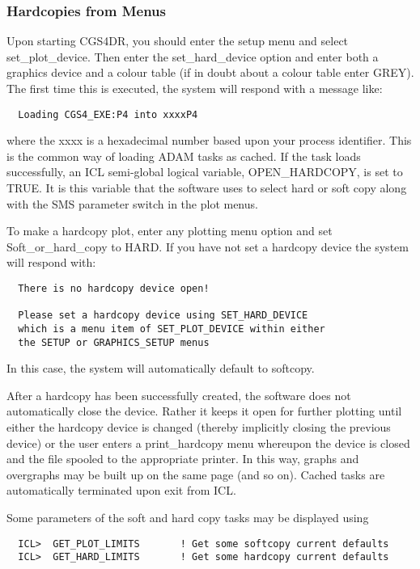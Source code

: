 {\subsubsection{Hardcopies from Menus}

Upon starting CGS4DR, you should enter the {\sf setup}  menu and select
{\sf set\_plot\_device}. Then enter the {\sf set\_hard\_device} option
and enter both a graphics device and a colour table (if in doubt about
a colour table enter {\sf GREY}). The first time this is executed, the system
will respond with a message like:

\begin{verbatim}
  Loading CGS4_EXE:P4 into xxxxP4
\end{verbatim}

where the {\sf xxxx} is a hexadecimal number based upon your process identifier.
This is the common way of loading ADAM tasks as cached. If the task loads
successfully, an ICL semi-global logical variable, {\sf OPEN\_HARDCOPY}, is set 
to {\sf TRUE}. It is this variable that the software uses to select hard or
soft copy along with the SMS parameter switch in the plot menus.

To make a hardcopy plot, enter any plotting menu option and set
{\sf Soft\_or\_hard\_copy}  to {\sf HARD}. If you have not set a hardcopy
device the system will respond with:

\begin{verbatim}
  There is no hardcopy device open!

  Please set a hardcopy device using SET_HARD_DEVICE
  which is a menu item of SET_PLOT_DEVICE within either
  the SETUP or GRAPHICS_SETUP menus
\end{verbatim}

In this case, the system will automatically default to softcopy.

After a hardcopy has been successfully created, the software does not 
automatically close the device. Rather it keeps it open for further plotting
until either the hardcopy device is changed (thereby implicitly closing
the previous device) or the user enters a {\sf print\_hardcopy} menu
whereupon the device is closed and the file spooled to the appropriate
printer. In this way, graphs and overgraphs may be built up on the same 
page (and so on). Cached tasks are automatically terminated upon exit from ICL.

Some parameters of the soft and hard copy tasks may be displayed using
\begin{verbatim}
  ICL>  GET_PLOT_LIMITS       ! Get some softcopy current defaults
  ICL>  GET_HARD_LIMITS       ! Get some hardcopy current defaults
\end{verbatim}

}
